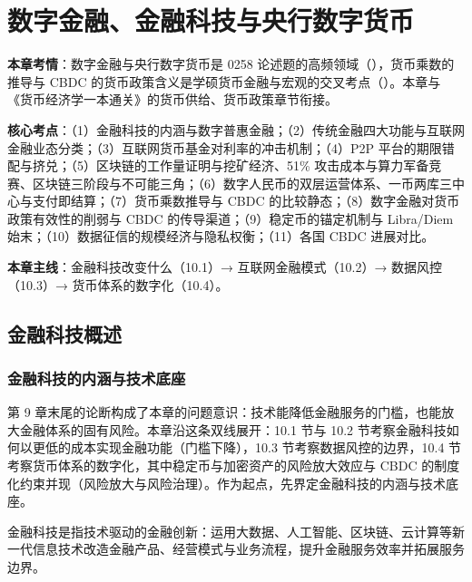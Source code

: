 \chapter{数字金融、金融科技与央行数字货币}

\begin{examguide}
\textbf{本章考情}：数字金融与央行数字货币是 0258 论述题的高频领域（），货币乘数的推导与 CBDC 的货币政策含义是学硕货币金融与宏观的交叉考点（）。本章与《货币经济学一本通关》的货币供给、货币政策章节衔接。

\textbf{核心考点}：（1）金融科技的内涵与数字普惠金融；（2）传统金融四大功能与互联网金融业态分类；（3）互联网货币基金对利率的冲击机制；（4）P2P 平台的期限错配与挤兑；（5）区块链的工作量证明与挖矿经济、51\% 攻击成本与算力军备竞赛、区块链三阶段与不可能三角；（6）数字人民币的双层运营体系、一币两库三中心与支付即结算；（7）货币乘数推导与 CBDC 的比较静态；（8）数字金融对货币政策有效性的削弱与 CBDC 的传导渠道；（9）稳定币的锚定机制与 Libra/Diem 始末；（10）数据征信的规模经济与隐私权衡；（11）各国 CBDC 进展对比。

\textbf{本章主线}：金融科技改变什么（10.1）→ 互联网金融模式（10.2）→ 数据风控（10.3）→ 货币体系的数字化（10.4）。
\end{examguide}

\section{金融科技概述}

\subsection{金融科技的内涵与技术底座}

第 9 章末尾的论断构成了本章的问题意识：技术能降低金融服务的门槛，也能放大金融体系的固有风险。本章沿这条双线展开：10.1 节与 10.2 节考察金融科技如何以更低的成本实现金融功能（门槛下降），10.3 节考察数据风控的边界，10.4 节考察货币体系的数字化，其中稳定币与加密资产的风险放大效应与 CBDC 的制度化约束并现（风险放大与风险治理）。作为起点，先界定金融科技的内涵与技术底座。

\begin{definition}
金融科技是指技术驱动的金融创新：运用大数据、人工智能、区块链、云计算等新一代信息技术改造金融产品、经营模式与业务流程，提升金融服务效率并拓展服务边界。
\end{definition}


